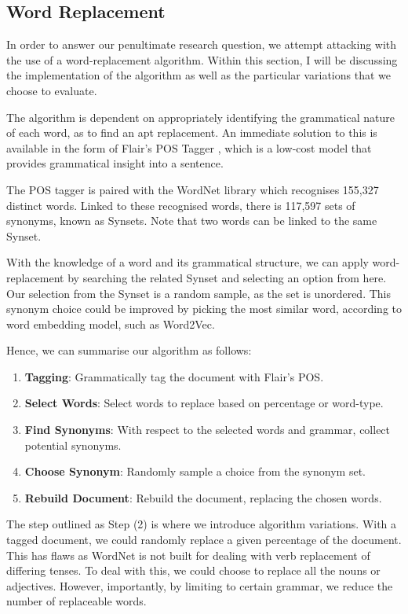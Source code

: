 \documentclass{l4proj}
\theoremstyle{definition}
\begin{document}
    \subsection{Word Replacement}
        In order to answer our penultimate research question, we attempt attacking with the use of a word-replacement algorithm. Within this section, I will be discussing the implementation of the algorithm as well as the particular variations that we choose to evaluate.

        The algorithm is dependent on appropriately identifying the grammatical nature of each word, as to find an apt replacement. An immediate solution to this is available in the form of Flair's POS Tagger \citep{akbik2018coling}, which is a low-cost model that provides grammatical insight into a sentence.

        The POS tagger is paired with the WordNet \citep{wordnet1998fellbaum} library which recognises 155,327 distinct words. Linked to these recognised words, there is 117,597 sets of synonyms, known as Synsets. Note that two words can be linked to the same Synset. 

        With the knowledge of a word and its grammatical structure, we can apply word-replacement by searching the related Synset and selecting an option from here. Our selection from the Synset is a random sample, as the set is unordered. This synonym choice could be improved by picking the most similar word, according to word embedding model, such as Word2Vec.

        Hence, we can summarise our algorithm as follows:
        \begin{enumerate}
            \item \textbf{Tagging}: Grammatically tag the document with Flair's POS.
            \item \textbf{Select Words}: Select words to replace based on percentage or word-type.
            \item \textbf{Find Synonyms}: With respect to the selected words and grammar, collect potential synonyms.
            \item \textbf{Choose Synonym}: Randomly sample a choice from the synonym set.
            \item \textbf{Rebuild Document}: Rebuild the document, replacing the chosen words.
        \end{enumerate}

        The step outlined as Step (2) is where we introduce algorithm variations. With a tagged document, we could randomly replace a given percentage of the document. This has flaws as WordNet is not built for dealing with verb replacement of differing tenses. To deal with this, we could choose to replace all the nouns or adjectives. However, importantly, by limiting to certain grammar, we reduce the number of replaceable words.
\end{document}

